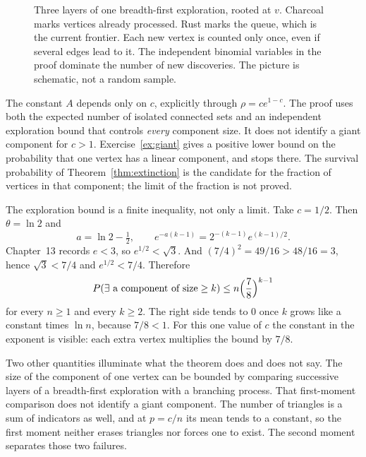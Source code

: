 \begin{figure}[ht]
\centering
{}
\caption{Three layers of one breadth-first exploration, rooted at $v$. Charcoal marks vertices already processed. Rust marks the queue, which is the current frontier. Each new vertex is counted only once, even if several edges lead to it. The independent binomial variables in the proof dominate the number of new discoveries. The picture is schematic, not a random sample.}
\label{fig:exploration}
\end{figure}

The constant $A$ depends only on $c$, explicitly through $\rho=ce^{1-c}$. The proof uses both the expected number of isolated connected sets and an independent exploration bound that controls \emph{every} component size. It does not identify a giant component for $c>1$. Exercise~\ref{ex:giant} gives a positive lower bound on the probability that one vertex has a linear component, and stops there. The survival probability of Theorem~\ref{thm:extinction} is the candidate for the fraction of vertices in that component; the limit of the fraction is not proved.

The exploration bound is a finite inequality, not only a limit. Take $c=1/2$. Then $\theta=\ln 2$ and
\[
 a=\ln 2-\tfrac12,\qquad
 e^{-a(k-1)}=2^{-(k-1)}e^{(k-1)/2}.
\]
Chapter~13 records $e<3$, so $e^{1/2}<\sqrt3$. And $(7/4)^2=49/16>48/16=3$, hence $\sqrt3<7/4$ and $e^{1/2}<7/4$. Therefore
\[
 P(\exists\text{ a component of size}\ge k)
 \le n\Bigl(\frac78\Bigr)^{k-1}
\]
for every $n\ge1$ and every $k\ge2$. The right side tends to $0$ once $k$ grows like a constant times $\ln n$, because $7/8<1$. For this one value of $c$ the constant in the exponent is visible: each extra vertex multiplies the bound by $7/8$.

Two other quantities illuminate what the theorem does and does not say. The size of the component of one vertex can be bounded by comparing successive layers of a breadth-first exploration with a branching process. That first-moment comparison does not identify a giant component. The number of triangles is a sum of indicators as well, and at $p=c/n$ its mean tends to a constant, so the first moment neither erases triangles nor forces one to exist. The second moment separates those two failures.

